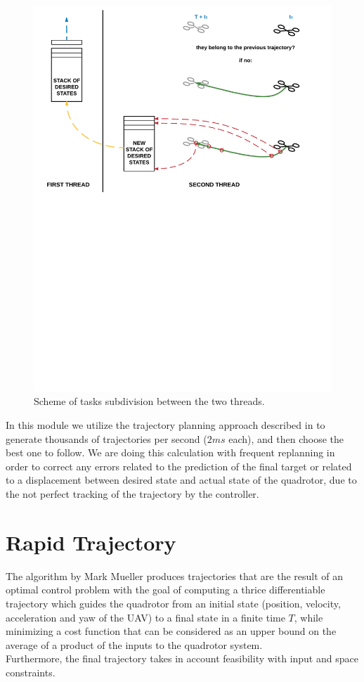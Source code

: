 \begin{figure}[!htbp]
    \centering
    \includegraphics[width=1.0\textwidth]{img/threads_trajectory_generation.pdf}
    \caption{Scheme of tasks subdivision between the two threads.}
    \label{fig:traject_gen}
\end{figure}

In this module we utilize the trajectory planning approach described in \cite{mueller2015computationally} to generate thousands of trajectories per second ($2ms$ each), and then choose the best one to follow. We are doing this calculation with frequent replanning in order to correct any errors related to the prediction of the final target or related to a displacement between desired state and actual state of the quadrotor, due to the not perfect tracking of the trajectory by the controller.\\

\section{Rapid Trajectory}
The algorithm by Mark Mueller  produces trajectories that are the result of an optimal control problem with the goal of computing a thrice differentiable trajectory which guides the quadrotor from an initial state (position, velocity, acceleration and yaw of the UAV) to a final state in a finite time $T$, while minimizing a cost function that can be considered as an upper bound on the average of a product of the inputs to the quadrotor system.\\ Furthermore, the final trajectory takes in account feasibility with input and space constraints.

